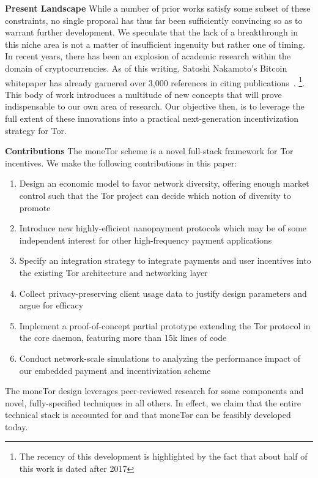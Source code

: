 \textbf{Present Landscape} While a number of prior works satisfy some subset of
these constraints, no single proposal has thus far been sufficiently convincing
so as to warrant further development. We speculate that the lack of a
breakthrough in this niche area is not a matter of insufficient ingenuity but
rather one of timing. In recent years, there has been an explosion of academic
research within the domain of cryptocurrencies. As of this writing, Satoshi
Nakamoto's Bitcoin whitepaper has already garnered over 3,000 references in
citing publications~\cite{nakamoto2008bitcoin}.
\footnote{The recency of this
  development is highlighted by the fact that about half of this work is dated
  after 2017}. 
This body of work introduces a multitude of new concepts that
will prove indispensable to our own area of research. Our objective then, is to
leverage the full extent of these innovations into a practical next-generation
incentivization strategy for Tor.

\label{sec:Contributions}
\textbf{Contributions} The moneTor scheme is a novel full-stack framework for
Tor incentives. We make the following contributions in this paper:

\begin{enumerate}
\item Design an economic model to favor network diversity, offering enough
  market control such that the Tor project can decide which notion of diversity
  to promote
\item Introduce new highly-efficient nanopayment protocols which may be of some
  independent interest for other high-frequency payment applications
\item Specify an integration strategy to integrate payments and user incentives
  into the existing Tor architecture and networking layer
\item Collect privacy-preserving client usage data to justify design parameters
  and argue for efficacy
\item Implement a proof-of-concept partial prototype extending the Tor protocol
  in the core daemon, featuring more than 15k lines of code
\item Conduct network-scale simulations to analyzing the performance impact of
  our embedded payment and incentivization scheme
\end{enumerate}

The moneTor design leverages peer-reviewed research for some components and
novel, fully-specified techniques in all others. In effect, we claim that the
entire technical stack is accounted for and that moneTor can be feasibly
developed today.
